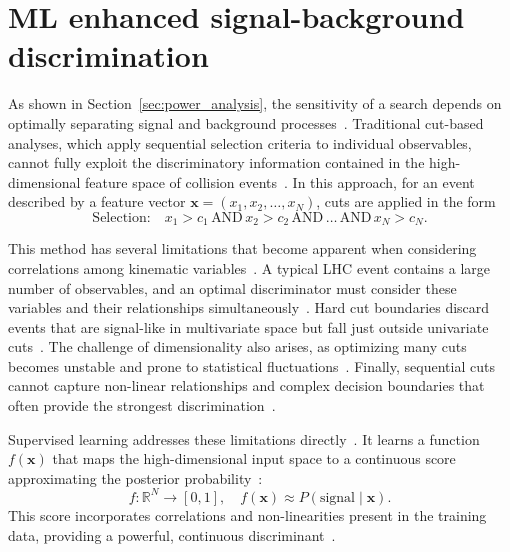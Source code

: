 \section{ML enhanced signal-background discrimination}
\label{sec:machine_learning}

As shown in Section~\ref{sec:power_analysis}, the sensitivity of a search depends on optimally separating signal and background processes~\cite{Cowan:2011,Guest2018}. Traditional cut-based analyses, which apply sequential selection criteria to individual observables, cannot fully exploit the discriminatory information contained in the high-dimensional feature space of collision events~\cite{Hastie2009,Guest2018}. In this approach, for an event described by a feature vector $\mathbf{x} = (x_1, x_2, \ldots, x_N)$, cuts are applied in the form~\cite{Hoecker2007}
\begin{equation}
\text{Selection:} \quad x_1 > c_1 \,\text{AND}\, x_2 > c_2 \,\text{AND}\, \ldots \,\text{AND}\, x_N > c_N.
\end{equation}

This method has several limitations that become apparent when considering correlations among kinematic variables~\cite{Hastie2009,Guest2018}. A typical LHC event contains a large number of observables, and an optimal discriminator must consider these variables and their relationships simultaneously~\cite{Hoecker2007,pedregosa_scikit-learn_2011}. Hard cut boundaries discard events that are signal-like in multivariate space but fall just outside univariate cuts~\cite{Hastie2009,Guest2018}. The challenge of dimensionality also arises, as optimizing many cuts becomes unstable and prone to statistical fluctuations~\cite{Hastie2009,friedman_greedy_2001}. Finally, sequential cuts cannot capture non-linear relationships and complex decision boundaries that often provide the strongest discrimination~\cite{Hastie2009,Guest2018}.

Supervised learning addresses these limitations directly~\cite{Hastie2009,Guest2018}. It learns a function $f(\mathbf{x})$ that maps the high-dimensional input space to a continuous score approximating the posterior probability~\cite{Cranmer2015,Platt1999}:
\begin{equation}
f: \mathbb{R}^N \rightarrow [0,1], \quad f(\mathbf{x}) \approx P(\text{signal} \mid \mathbf{x}).
\end{equation}
This score incorporates correlations and non-linearities present in the training data, providing a powerful, continuous discriminant~\cite{Hastie2009,Guest2018}.

